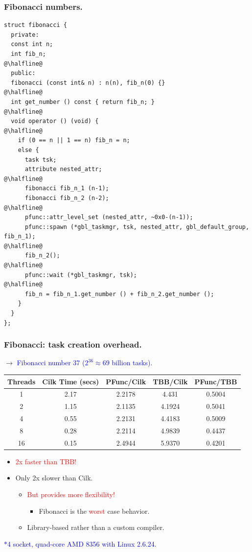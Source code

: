 \documentclass{beamer}
\newcommand{\tablefont}{\fontsize{8}{13}\selectfont}
\begin{document}
\begin{frame}[fragile]
\frametitle{Fibonacci numbers.}
\begin{center}
\begin{minipage}{0.75\textwidth}
\begin{lstlisting}
struct fibonacci {
  private:
  const int n;
  int fib_n;
@\halfline@
  public:
  fibonacci (const int& n) : n(n), fib_n(0) {}
@\halfline@
  int get_number () const { return fib_n; }
@\halfline@
  void operator () (void) {
@\halfline@
    if (0 == n || 1 == n) fib_n = n;
    else {
      task tsk; 
      attribute nested_attr;
@\halfline@
      fibonacci fib_n_1 (n-1);
      fibonacci fib_n_2 (n-2);
@\halfline@
      pfunc::attr_level_set (nested_attr, ~0x0-(n-1));
      pfunc::spawn (*gbl_taskmgr, tsk, nested_attr, gbl_default_group, fib_n_1);
@\halfline@
      fib_n_2();
@\halfline@
      pfunc::wait (*gbl_taskmgr, tsk);
@\halfline@
      fib_n = fib_n_1.get_number () + fib_n_2.get_number ();
    }
  }
};
\end{lstlisting}
\end{minipage}
\end{center}
\end{frame}

\begin{frame}[fragile]
\frametitle{Fibonacci: task creation overhead.}
$\rightarrow{}$ \textcolor{blue}{Fibonacci number 37 ($2^{36}\approx{}69$ billion tasks).}
\tablefont
\begin{center}
\begin{tabular}{|c|c|c|c|c|} 
\hline
Threads & Cilk Time (secs) & PFunc/Cilk & TBB/Cilk & PFunc/TBB \\
\hline
1  & 2.17 & 2.2178  & 4.431 & 0.5004 \\ 
\hline
2  & 1.15 & 2.1135 & 4.1924 & 0.5041 \\ 
\hline
4  & 0.55 & 2.2131 & 4.4183 & 0.5009 \\ 
\hline
8  & 0.28 & 2.2114 & 4.9839 & 0.4437 \\ 
\hline
16 & 0.15 & 2.4944 & 5.9370 & 0.4201 \\ 
\hline
\end{tabular}
\end{center}
\normalsize
\begin{itemize}
\item \textcolor{red}{2x faster than TBB!}
\item Only 2x slower than Cilk.
  \begin{itemize}
  \item \textcolor{red}{But provides more flexibility!}
    \begin{itemize}
    \item Fibonacci is the \textcolor{red}{worst} case behavior.
    \end{itemize}
  \item Library-based rather than a custom compiler.
  \end{itemize}
\end{itemize}
\tiny\textcolor{blue}{$\ast{}$4 socket, quad-core AMD 8356 with Linux 2.6.24.}\normalsize
\end{frame}
\end{document}
